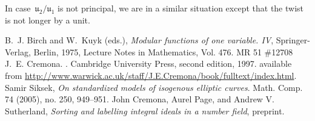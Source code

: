 \documentclass{article}
\theoremstyle{remark}
\def\u{{\mathfrak u}}
\begin{document}
In case~$\u_2/\u_1$ is not principal, we are in a similar situation
except that the twist is not longer by a unit.



\begin{thebibliography}{10}
\providecommand{\MR}{\relax\ifhmode\unskip\space\fi MR }
B.~J. Birch and W.~Kuyk (eds.), \emph{Modular functions of one variable. {IV}},
  Springer-Verlag, Berlin, 1975, Lecture Notes in Mathematics, Vol. 476. \MR{51
  \#12708}
J.~E. Cremona.
.
\newblock Cambridge University Press, second edition, 1997.
\newblock available from
  \url{http://www.warwick.ac.uk/staff/J.E.Cremona/book/fulltext/index.html}.
 Samir Siksek, {\em On standardized models of
  isogenous elliptic curves}. Math. Comp. 74 (2005), no. 250, 949--951.
 John Cremona, Aurel Page, and Andrew
  V. Sutherland, {\em Sorting and labelling integral ideals in a
    number field}, preprint.
\end{thebibliography}
\end{document}
